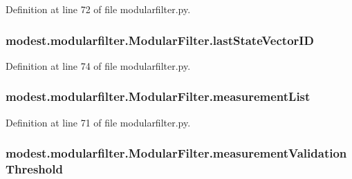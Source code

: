 Definition at line 72 of file modularfilter.\+py.

\subsubsection[{\texorpdfstring{last\+State\+Vector\+ID}{lastStateVectorID}}]{\setlength{\rightskip}{0pt plus 5cm}modest.\+modularfilter.\+Modular\+Filter.\+last\+State\+Vector\+ID}\hypertarget{classmodest_1_1modularfilter_1_1ModularFilter_ab68eefa9ffabb7f9b4b4622fd7686fa0}{}\label{classmodest_1_1modularfilter_1_1ModularFilter_ab68eefa9ffabb7f9b4b4622fd7686fa0}


Definition at line 74 of file modularfilter.\+py.

\subsubsection[{\texorpdfstring{measurement\+List}{measurementList}}]{\setlength{\rightskip}{0pt plus 5cm}modest.\+modularfilter.\+Modular\+Filter.\+measurement\+List}\hypertarget{classmodest_1_1modularfilter_1_1ModularFilter_a691b2974939eedf436beea187b0714dd}{}\label{classmodest_1_1modularfilter_1_1ModularFilter_a691b2974939eedf436beea187b0714dd}


Definition at line 71 of file modularfilter.\+py.

\subsubsection[{\texorpdfstring{measurement\+Validation\+Threshold}{measurementValidationThreshold}}]{\setlength{\rightskip}{0pt plus 5cm}modest.\+modularfilter.\+Modular\+Filter.\+measurement\+Validation\+Threshold}\hypertarget{classmodest_1_1modularfilter_1_1ModularFilter_af91295c2d8f45afe04386215b5fa39aa}{}\label{classmodest_1_1modularfilter_1_1ModularFilter_af91295c2d8f45afe04386215b5fa39aa}


